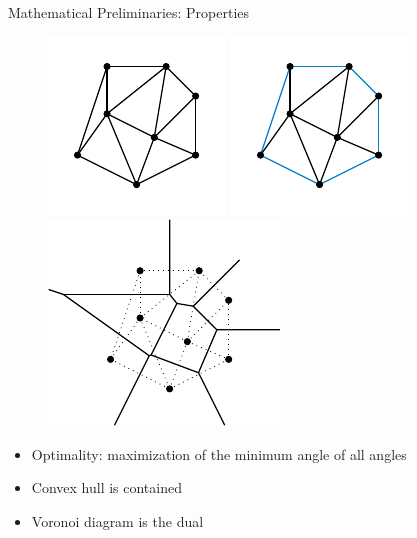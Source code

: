 \documentclass[aspectratio=169]{beamer}
\begin{document}
  \begin{frame}{Mathematical Preliminaries: Properties}
    \begin{figure}
      \center
      \includegraphics[scale=1.3]{figures/delaunay-triangulation.pdf}
      \includegraphics[scale=1.3]{figures/delaunay-triangulation-convex-hull.pdf}
      \includegraphics[scale=1.3]{figures/delaunay-triangulation-voronoi.pdf}
    \end{figure}
    \begin{itemize}
      \item Optimality: maximization of the minimum angle of all angles
      \item Convex hull is contained
      \item Voronoi diagram is the dual
    \end{itemize}
  \end{frame}
\end{document}
